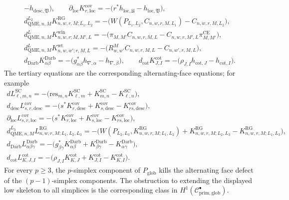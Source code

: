 \begin{defn}
\begin{enumerate}[label=\textup{(D\arabic*)}]
\[\begin{gathered}
        -h_{\mathrm{desc},\mathfrak V}\bigr),\qquad
      \partial_{\mathrm{loc}}K^{\mathrm{cov}}_{r,\mathrm{loc}}
      =-\bigl(r^*h_{\mathrm{loc},\mathfrak U}
        -h_{\mathrm{loc},\mathfrak V}\bigr),\\
      d^{L_2}_{\mathrm{QME},n,M}K^{\mathrm{RG}}_{n,w,r,M;L_1,L_2}
      =-\bigl(W(P_{L_1,L_2},C_{n,w,r,M,L_1})
        -C_{n,w,r,M,L_2}\bigr),\\
      d^L_{\mathrm{QME},n,M}K^{\mathrm{win}}_{n,w,r;M,M',L}
      =-\bigl(\pi_{M,M'}C_{n,w,r,M,L}
        -C_{n,w,r,M',L}\pi^{\mathrm{CE}}_{M,M'}\bigr),\\
      d^L_{\mathrm{QME},n,M}K^{\mathrm{wt}}_{n,w,w';r,M,L}
      =-\bigl(R^M_{w,w'}C_{n,w,r,M,L}-C_{n,w',r,M,L}\bigr),\\
      d_{\mathrm{Darb}}K^{\mathrm{Darb}}_{\alpha\beta}
      =-\bigl(g_{\alpha\beta}^*h_{\nabla,\alpha}
        -h_{\nabla,\beta}\bigr),\qquad
      d_{\mathrm{cot}}K^{\mathrm{cot}}_{J,I}
      =-\bigl(\rho_{J,I}h_{\mathrm{cot},J}-h_{\mathrm{cot},I}\bigr).
    \end{gathered}
    \]
    The tertiary equations are the corresponding alternating-face
    equations; for example
    \[
    \begin{gathered}
      dL^{\mathrm{SC}}_{\ell,m,n}
      =
      -\bigl(\mathrm{res}_{m,n}K^{\mathrm{SC}}_{\ell,m}
        +K^{\mathrm{SC}}_{m,n}-K^{\mathrm{SC}}_{\ell,n}\bigr),\\
      d_{\mathrm{desc}}L^{\mathrm{cov}}_{s,r,\mathrm{desc}}
      =
      -\bigl(s^*K^{\mathrm{cov}}_{r,\mathrm{desc}}
        +K^{\mathrm{cov}}_{s,\mathrm{desc}}
        -K^{\mathrm{cov}}_{rs,\mathrm{desc}}\bigr),\\
      \partial_{\mathrm{loc}}L^{\mathrm{cov}}_{s,r,\mathrm{loc}}
      =
      -\bigl(s^*K^{\mathrm{cov}}_{r,\mathrm{loc}}
        +K^{\mathrm{cov}}_{s,\mathrm{loc}}
        -K^{\mathrm{cov}}_{rs,\mathrm{loc}}\bigr),\\
      d^{L_3}_{\mathrm{QME},n,M}L^{\mathrm{RG}}_{n,w,r,M;L_1,L_2,L_3}
      =
      -\bigl(W(P_{L_2,L_3},K^{\mathrm{RG}}_{n,w,r,M;L_1,L_2})
        +K^{\mathrm{RG}}_{n,w,r,M;L_2,L_3}
        -K^{\mathrm{RG}}_{n,w,r,M;L_1,L_3}\bigr),\\
      d_{\mathrm{Darb}}L^{\mathrm{Darb}}_{\alpha\beta\gamma}
      =
      -\bigl(g_{\beta\gamma}^*K^{\mathrm{Darb}}_{\alpha\beta}
        +K^{\mathrm{Darb}}_{\beta\gamma}
        -K^{\mathrm{Darb}}_{\alpha\gamma}\bigr),\\
      d_{\mathrm{cot}}L^{\mathrm{cot}}_{K,J,I}
      =
      -\bigl(\rho_{J,I}K^{\mathrm{cot}}_{K,J}
        +K^{\mathrm{cot}}_{J,I}
        -K^{\mathrm{cot}}_{K,I}\bigr).
    \end{gathered}
    \]
    For every \(p\ge3\), the \(p\)-simplex component of
    \(P_{\mathrm{glob}}\) kills the alternating face defect of the
    \((p-1)\)-simplex components.  The obstruction to extending the
    displayed low skeleton to all simplices is the corresponding class
    in \(H^1(\mathcal C^\bullet_{\mathrm{prim,glob}})\).


\end{enumerate}
\end{defn}
